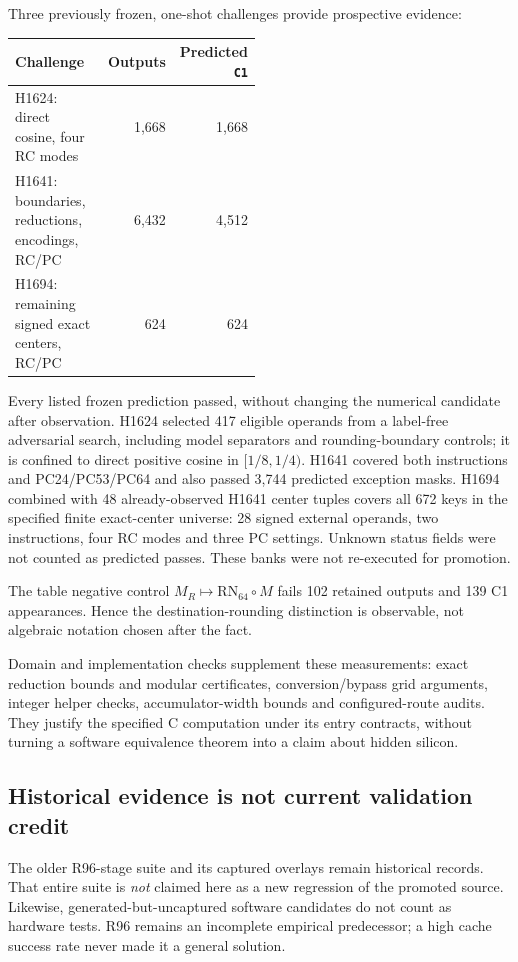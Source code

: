 \documentclass[11pt]{article}
\newcommand{\rn}[1]{\mathrm{RN}_{#1}}       %
\begin{document}
Three previously frozen, one-shot challenges provide prospective evidence:
\begin{center}
\small
\begin{tabular}{p{0.49\linewidth}rr}
\toprule
Challenge & Outputs & Predicted \texttt{C1}\\
\midrule
H1624: direct cosine, four RC modes & 1{,}668 & 1{,}668\\
H1641: boundaries, reductions, encodings, RC/PC & 6{,}432 & 4{,}512\\
H1694: remaining signed exact centers, RC/PC & 624 & 624\\
\bottomrule
\end{tabular}
\end{center}
Every listed frozen prediction passed, without changing the numerical
candidate after observation. H1624 selected 417 eligible operands from a
label-free adversarial search, including model separators and rounding-boundary
controls; it is confined to direct positive cosine in $[1/8,1/4)$.
H1641 covered both instructions and PC24/PC53/PC64 and also passed 3{,}744
predicted exception masks. H1694 combined with 48 already-observed H1641
center tuples covers all 672 keys in the specified finite exact-center
universe: 28 signed external operands, two instructions, four RC modes and
three PC settings. Unknown status fields were not counted as predicted passes.
These banks were not re-executed for promotion.

The table negative control $M_R\mapsto\rn{64}\circ M$ fails 102 retained
outputs and 139 C1 appearances. Hence the destination-rounding distinction
is observable, not algebraic notation chosen after the fact.

Domain and implementation checks supplement these measurements: exact
reduction bounds and modular certificates, conversion/bypass grid arguments,
integer helper checks, accumulator-width bounds and configured-route audits.
They justify the specified C computation under its entry contracts, without
turning a software equivalence theorem into a claim about hidden silicon.

\subsection{Historical evidence is not current validation credit}
\label{sec:residual}

The older R96-stage suite and its captured overlays
remain historical records. That entire suite is \emph{not} claimed here
as a new regression of the promoted source. Likewise, generated-but-uncaptured
software candidates do not count as hardware tests.
R96 remains an incomplete empirical predecessor; a high cache success rate
never made it a general solution.
\end{document}
